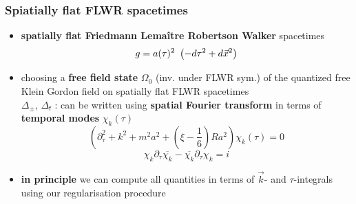 \documentclass[9pt]{beamer}
\newcommand{\fsf}{\mathsf{f}}
\begin{document}

\begin{frame}
 
\frametitle{Spiatially flat FLWR spacetimes} 

\begin{itemize}
 
\item \textbf{spatially flat Friedmann Lemaître Robertson Walker} spacetimes
\vspace*{-12pt}
\begin{equation*}
g = a(\tau)^2 \ \left( - d\tau^2 + d\vec{x}^2 \right) 
\vspace*{-8pt}
\end{equation*}

\item choosing a \textbf{free field state} $\Omega_0$ (inv. under FLWR sym.) of the quantized free Klein Gordon field on spatially flat FLWR spacetimes \\
$\Delta_\pm$, $\Delta_\fsf$ : can be written using \textbf{spatial Fourier transform} in terms of \textbf{temporal modes} $\chi_k(\tau)$
\vspace*{-6pt}
\begin{equation*}
\left( \partial^2_\tau + k^2 + m^2a^2 + \left( \xi - \frac16 \right)Ra^2 \right) \chi_k(\tau) = 0 
\end{equation*}
\begin{equation*}
\chi_k \partial_\tau \overline{\chi_k} - \overline{\chi_k} \partial_\tau {\chi_k} =i 
\end{equation*}

\item \textbf{in principle} we can compute all quantities in terms of $\vec{k}$- and $\tau$-integrals using our regularisation procedure 
  
\end{itemize}
 
\end{frame}

\end{document}
